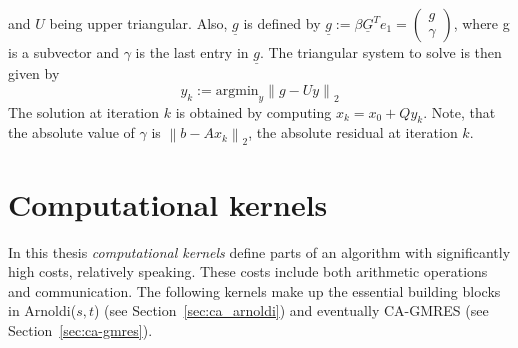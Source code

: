\documentclass{scrartcl}
\numberwithin{equation}{section}
\newcommand{\norm}[1]{\left\lVert#1\right\rVert}
\begin{document}
and $U$ being upper triangular. Also, $\underline{g}$ is defined by $\underline{g} := \beta \underline{G}^T e_1 = \begin{pmatrix}
g\\
\gamma
\end{pmatrix}$,
where g is a subvector and $\gamma$ is the last entry in $\underline{g}$. The triangular system to solve is then given by
\begin{equation*}
	y_k := \text{argmin}_y \norm{g - U y}_2
\end{equation*}
The solution at iteration $k$ is obtained by computing $x_k = x_0 + Qy_k$. Note, that the absolute value of $\gamma$ is $\norm{b - Ax_k}_2$, the absolute residual at iteration $k$.


\section{Computational kernels}
In this thesis \textit{computational kernels} define parts of an algorithm with significantly high costs, relatively speaking. These costs include both arithmetic operations and communication. The following kernels make up the essential building blocks in Arnoldi($s,t$) (see Section~\ref{sec:ca_arnoldi}) and eventually CA-GMRES (see Section~\ref{sec:ca-gmres}).
\end{document}
